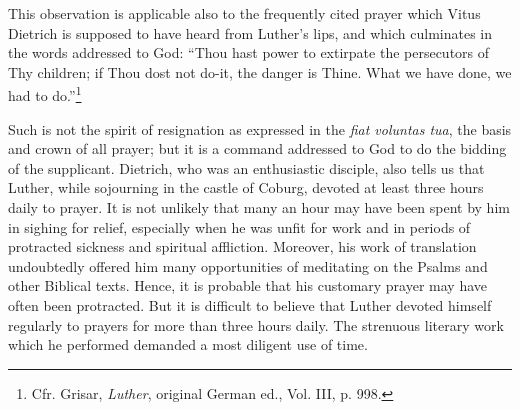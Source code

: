 This observation is applicable also to the frequently cited prayer which Vitus
Dietrich is supposed to have heard from Luther’s lips, and which culminates in
the words addressed to God: “Thou hast power to extirpate the persecutors of
Thy children; if Thou dost not do-it, the danger is Thine. What we have done,
we had to do.”\footnote{Cfr. Grisar, \textit{Luther}, original German ed., Vol.
III, p. 998.}

Such is not the spirit of resignation as expressed in the \textit{fiat voluntas
tua}, the basis and crown of all prayer; but it is a command addressed
to God to do the bidding of the supplicant. Dietrich, who was an
enthusiastic disciple, also tells us that Luther, while sojourning in the
castle of Coburg, devoted at least three hours daily to prayer. It is
not unlikely that many an hour may have been spent by him in sighing for
relief, especially when he was unfit for work and in periods
of protracted sickness and spiritual affliction. Moreover, his work of
translation undoubtedly offered him many opportunities of meditating on
the Psalms and other Biblical texts. Hence, it is probable that
his customary prayer may have often been protracted. But it is difficult
to believe that Luther devoted himself regularly to prayers for
more than three hours daily. The strenuous literary work which he
performed demanded a most diligent use of time.
